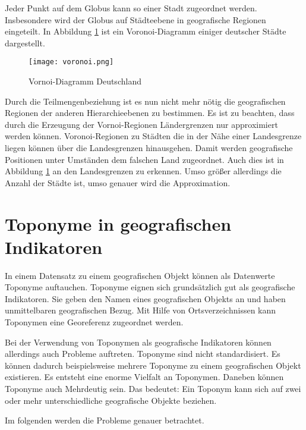 				Jeder Punkt auf dem Globus kann so einer Stadt zugeordnet werden.
				Insbesondere wird der Globus auf Städteebene in geografische Regionen eingeteilt.
				In Abbildung \ref{img:voronoi} ist ein Voronoi-Diagramm einiger deutscher Städte dargestellt.

				\begin{figure}[h!]
				\begin{center}
				\texttt{[image: voronoi.png]}
				\caption{Vornoi-Diagramm Deutschland}
				\label{img:voronoi}
				\end{center}
				\end{figure}	

				Durch die Teilmengenbeziehung ist es nun nicht mehr nötig die geografischen Regionen der anderen Hierarchieebenen zu bestimmen.
				Es ist zu beachten, dass durch die Erzeugung der Vornoi-Regionen Ländergrenzen nur approximiert werden können. 
				Voronoi-Regionen zu Städten die in der Nähe einer Landesgrenze liegen können über die Landesgrenzen hinausgehen. 
				Damit werden geografische Positionen unter Umständen dem falschen Land zugeordnet.
				Auch dies ist in Abbildung \ref{img:voronoi} an den Landesgrenzen zu erkennen. 
				Umso größer allerdings die Anzahl der Städte ist, umso genauer wird die Approximation.

	\section{Toponyme in geografischen Indikatoren} \label{sec:ToponymeInGeografischenIndikatoren}

		In einem Datensatz zu einem geografischen Objekt können als Datenwerte Toponyme auftauchen.
		Toponyme eignen sich grundsätzlich gut als geografische Indikatoren.
		Sie geben den Namen eines geografischen Objekts an und haben unmittelbaren geografischen Bezug. 
		Mit Hilfe von Ortsverzeichnissen kann Toponymen eine Georeferenz zugeordnet werden.
		
		Bei der Verwendung von Toponymen als geografische Indikatoren können allerdings auch  Probleme auftreten.
		Toponyme sind nicht standardisiert.
		Es können dadurch beispielsweise mehrere Toponyme zu einem geografischen Objekt existieren.
		Es entsteht eine enorme Vielfalt an Toponymen. 
		Daneben können Toponyme auch Mehrdeutig sein.
		Das bedeutet: Ein Toponym kann sich auf zwei oder mehr unterschiedliche geografische Objekte beziehen.

		Im folgenden werden die Probleme genauer betrachtet.

